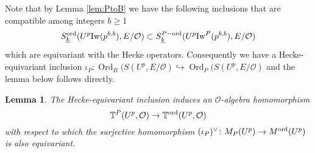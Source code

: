 \documentclass[leqno]{amsart}
\newtheorem{lem}[thm]{Lemma}
\theoremstyle{definition}
\theoremstyle{remark}
\newcommand{\oo}{\mathcal{O}}
\DeclareMathOperator{\Ord}{Ord} %
\newcommand{\wt}[1]{\underline{ #1 }}
\newcommand{\Iw}{\textnormal{Iw}} %
\newcommand{\TT}{\mathbb{T}} %
\newcommand{\ord}{\textnormal{ord}} %
\begin{document}
Note that by Lemma \ref{lem:PtoB}
we have the following inclusions
that are compatible among integers $b\geq 1$
\[
	S_{\wt{k}}^{\ord}(U^p\Iw(p^{b,b}),E/\oo)\subset
	S_{\wt{k}}^{P-\ord}(U^p\Iw^P(p^{b,b}),E/\oo)
\]
which are equivariant with the Hecke operators.
Consequently we have a Hecke-equivariant inclusion
$\iota_P\colon \Ord_B(S(U^p,E/\oo)\hookrightarrow\Ord_P(S(U^p,E/\oo)$
and the lemma below follows directly.

\begin{lem}\label{lem:coh_to_ord}
    The Hecke-equivariant inclusion
    induces an $\oo$-algebra homomorphism
    \[
        \TT^P(U^p,\oo)\to \TT^{\ord}(U^p,\oo)
    \]
    with respect to which 
    the surjective homomorphism 
	$(\iota_P)^\vee\colon M_P(U^p)\to M^{\ord}(U^p)$ 
    is also equivariant.
\end{lem}
\end{document}
